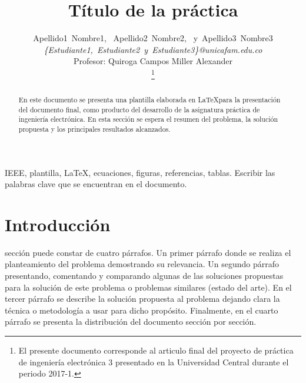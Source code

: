 \documentclass[journal]{IEEEtran}
\begin{document}
\title{Título de la práctica}
\author{Apellido1~Nombre1,~
        Apellido2~Nombre2,~
        y~Apellido3~Nombre3\\
				\textit{\{Estudiante1,~Estudiante2~y~Estudiante3\}@unicafam.edu.co}\\
				Profesor: Quiroga Campos Miller Alexander\\%
\thanks{El presente documento corresponde al articulo final del proyecto de práctica de ingeniería electrónica 3 presentado en la Universidad Central durante el periodo 2017-1.}} %

\maketitle

\begin{abstract}
En este documento se presenta una plantilla elaborada en \LaTeX para la presentación del documento final, como producto del desarrollo de la asignatura práctica de ingeniería electrónica. En esta sección se espera el resumen del problema, la solución propuesta y los principales resultados alcanzados.
\end{abstract}

\begin{IEEEkeywords}
IEEE, plantilla, \LaTeX, ecuaciones, figuras, referencias, tablas. Escribir las palabras clave que se encuentran en el documento.
\end{IEEEkeywords}

\section{Introducción}
 sección puede constar de cuatro párrafos. Un primer párrafo donde se realiza el planteamiento del problema demostrando su relevancia. Un segundo párrafo presentando, comentando y comparando algunas de las soluciones propuestas para la solución de este problema o problemas similares (estado del arte). En el tercer párrafo se describe la solución propuesta al problema dejando clara la técnica o metodología a usar para dicho propósito. Finalmente, en el cuarto párrafo se presenta la distribución del documento sección por sección.
\end{document}
